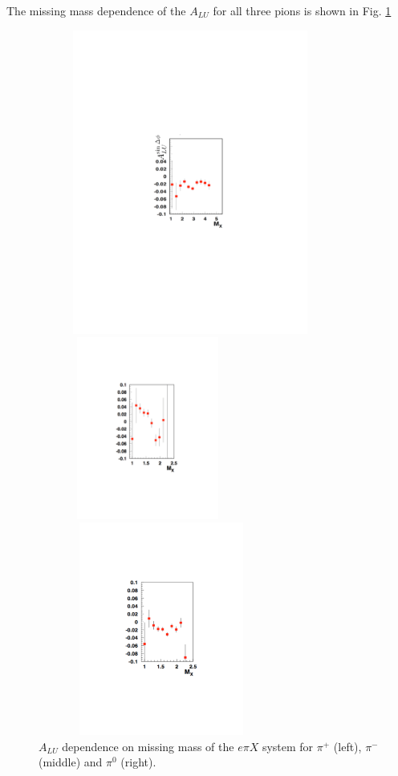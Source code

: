\documentclass[11pt,a4paper]{article}
\begin{document}
The missing mass dependence of the $A_{LU}$ for all three pions is shown
in Fig. \ref{fig:b2b-mx3}
\begin{figure}
\hskip -2cm
\begin{minipage}{.35\textwidth}
\includegraphics[width=10.0cm,height=10cm]{plots/alu-pipmx.pdf}
\end{minipage}
\begin{minipage}{.2\textwidth}
\includegraphics[width=7.2cm,height=6cm]{plots/alu-pimmx.pdf}
\end{minipage}
\begin{minipage}{.3\textwidth}
\includegraphics[width=8.1cm,height=7cm]{plots/alu-pi0mx.pdf}
\end{minipage}
   \caption{$A_{LU}$ dependence on missing mass of the $e\pi X$ system for $\pi^+$ (left), $\pi^-$ (middle) and  $\pi^0$ (right).}
 \label{fig:b2b-mx3}
 \end{figure} 
\end{document}
